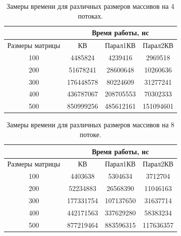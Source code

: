 \documentclass[12pt]{report}
\begin{document}
\begin{table}[h]
	\begin{center}
		\caption{\label{time3} Замеры времени для различных размеров массивов на 4 потоках.}
		\begin{tabular}{|c |c |c |c|} 
 			\hline
 			&\multicolumn{3}{|c|}{Время работы, нс}\\
 			\hline
			Размеры матрицы & КВ & Парал1КВ & Парал2КВ \\ [0.5ex] 
 			\hline\hline
 			100 & 4485824 & 4239416 & 2969518 \\
 			\hline
 			200 & 51678241 & 28600648 & 10260636 \\
 			\hline
			300 & 176448578 & 80224609 & 31277241 \\
			\hline
			400 & 436787067 & 208705553 & 70302333 \\
			\hline
			500 & 850999256 & 485612161 & 151094601 \\
			\hline
			\end{tabular}
	\end{center}
\end{table}

\begin{table}[h]
	\begin{center}
		\caption{\label{time4} Замеры времени для различных размеров массивов на 8 потоке.}
		\begin{tabular}{|c |c |c |c|} 
 			\hline
 			&\multicolumn{3}{|c|}{Время работы, нс}\\
 			\hline
			Размеры матрицы & КВ & Парал1КВ & Парал2КВ \\ [0.5ex] 
 			\hline\hline
 			100 & 4403638 & 5304634 & 3712704 \\
 			\hline
 			200 & 52234883 & 26568390 & 11046163 \\
 			\hline
			300 & 177331754 & 107137650 & 31637714 \\
			\hline
			400 & 442171563 & 337629280 & 58383234 \\
			\hline
			500 & 877219464 & 883596315 & 117636357 \\
			\hline
			\end{tabular}
	\end{center}
\end{table}
\end{document}
